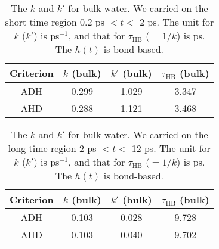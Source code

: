{%
\begin{table}[H] %
\centering
\caption{\label{tab:k_k_prime_128w_1} 
    The $k$ and $k'$ for bulk water. We carried on the short time region 0.2 ps $< t <$ 2 ps. 
The unit for $k$ ($k'$) is ps$^{-1}$, and that for $\tau_{\text{HB}}$ ($=1/k$) is ps. The $h(t)$ is bond-based.} 
\begin{tabular}{cccc}
 Criterion & $k$  (bulk) & $k'$ (bulk) & $\tau_{\text{HB}}$ (bulk) \\
\hline
  ADH & 0.299  & 1.029 & 3.347   \\
  AHD & 0.288 & 1.121 & 3.468 \\ 
\end{tabular}
\end{table}
%
\begin{table}[H]%
\centering
\caption{\label{tab:k_k_prime_128w_2} 
    The $k$ and $k'$ for bulk water. We carried on the long time region 2 ps $< t <$ 12 ps. 
The unit for $k$ ($k'$) is ps$^{-1}$, and that for $\tau_{\text{HB}}$ ($=1/k$) is ps. The $h(t)$ is bond-based.} 
\begin{tabular}{cccc}
 Criterion & $k$  (bulk) & $k'$ (bulk) & $\tau_{\text{HB}}$ (bulk) \\
\hline
  ADH & 0.103  & 0.028 & 9.728 \\
  AHD & 0.103  & 0.040 & 9.702  \\
\end{tabular}
\end{table}


}

